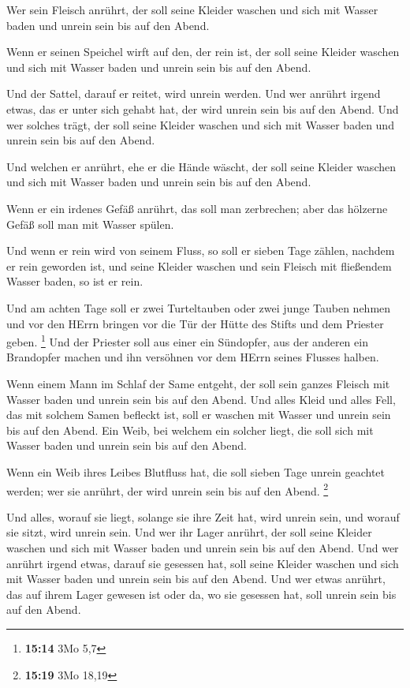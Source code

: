  Wer sein Fleisch anrührt, der soll seine Kleider waschen
und sich mit Wasser baden und unrein sein bis auf den Abend.

 Wenn er seinen Speichel wirft auf den, der rein ist, der
soll seine Kleider waschen und sich mit Wasser baden und unrein sein bis
auf den Abend.

 Und der Sattel, darauf er reitet, wird unrein werden.
 Und wer anrührt irgend etwas, das er unter sich gehabt
hat, der wird unrein sein bis auf den Abend. Und wer solches trägt, der
soll seine Kleider waschen und sich mit Wasser baden und unrein sein bis
auf den Abend.

 Und welchen er anrührt, ehe er die Hände wäscht, der soll
seine Kleider waschen und sich mit Wasser baden und unrein sein bis auf
den Abend.

 Wenn er ein irdenes Gefäß anrührt, das soll man
zerbrechen; aber das hölzerne Gefäß soll man mit Wasser spülen.

 Und wenn er rein wird von seinem Fluss, so soll er sieben
Tage zählen, nachdem er rein geworden ist, und seine Kleider waschen und
sein Fleisch mit fließendem Wasser baden, so ist er rein.

 Und am achten Tage soll er zwei Turteltauben oder zwei
junge Tauben nehmen und vor den HErrn bringen vor die Tür der Hütte des
Stifts und dem Priester geben. \footnote{\textbf{15:14} 3Mo 5,7}
 Und der Priester soll aus einer ein Sündopfer, aus der
anderen ein Brandopfer machen und ihn versöhnen vor dem HErrn seines
Flusses halben.

 Wenn einem Mann im Schlaf der Same entgeht, der soll sein
ganzes Fleisch mit Wasser baden und unrein sein bis auf den Abend.
 Und alles Kleid und alles Fell, das mit solchem Samen
befleckt ist, soll er waschen mit Wasser und unrein sein bis auf den
Abend.  Ein Weib, bei welchem ein solcher liegt, die soll
sich mit Wasser baden und unrein sein bis auf den Abend.

 Wenn ein Weib ihres Leibes Blutfluss hat, die soll sieben
Tage unrein geachtet werden; wer sie anrührt, der wird unrein sein bis
auf den Abend. \footnote{\textbf{15:19} 3Mo 18,19}

 Und alles, worauf sie liegt, solange sie ihre Zeit hat,
wird unrein sein, und worauf sie sitzt, wird unrein sein. 
Und wer ihr Lager anrührt, der soll seine Kleider waschen und sich mit
Wasser baden und unrein sein bis auf den Abend.  Und wer
anrührt irgend etwas, darauf sie gesessen hat, soll seine Kleider
waschen und sich mit Wasser baden und unrein sein bis auf den Abend.
 Und wer etwas anrührt, das auf ihrem Lager gewesen ist
oder da, wo sie gesessen hat, soll unrein sein bis auf den Abend.

